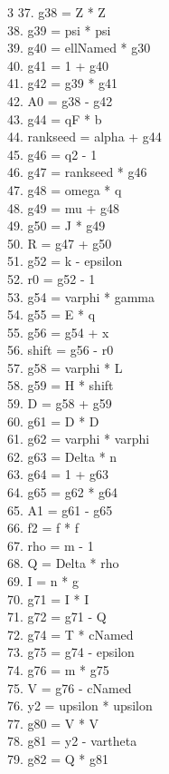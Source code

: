 \documentclass[10pt]{article}
\begin{document}
\begin{multicols}{3}
37. g38 = Z * Z\\
38. g39 = psi * psi\\
39. g40 = ellNamed * g30\\
40. g41 = 1 + g40\\
41. g42 = g39 * g41\\
42. A0 = g38 - g42\\
43. g44 = qF * b\\
44. rankseed = alpha + g44\\
45. g46 = q2 - 1\\
46. g47 = rankseed * g46\\
47. g48 = omega * q\\
48. g49 = mu + g48\\
49. g50 = J * g49\\
50. R = g47 + g50\\
51. g52 = k - epsilon\\
52. r0 = g52 - 1\\
53. g54 = varphi * gamma\\
54. g55 = E * q\\
55. g56 = g54 + x\\
56. shift = g56 - r0\\
57. g58 = varphi * L\\
58. g59 = H * shift\\
59. D = g58 + g59\\
60. g61 = D * D\\
61. g62 = varphi * varphi\\
62. g63 = Delta * n\\
63. g64 = 1 + g63\\
64. g65 = g62 * g64\\
65. A1 = g61 - g65\\
66. f2 = f * f\\
67. rho = m - 1\\
68. Q = Delta * rho\\
69. I = n * g\\
70. g71 = I * I\\
71. g72 = g71 - Q\\
72. g74 = T * cNamed\\
73. g75 = g74 - epsilon\\
74. g76 = m * g75\\
75. V = g76 - cNamed\\
76. y2 = upsilon * upsilon\\
77. g80 = V * V\\
78. g81 = y2 - vartheta\\
79. g82 = Q * g81\\

\end{multicols}
\end{document}
